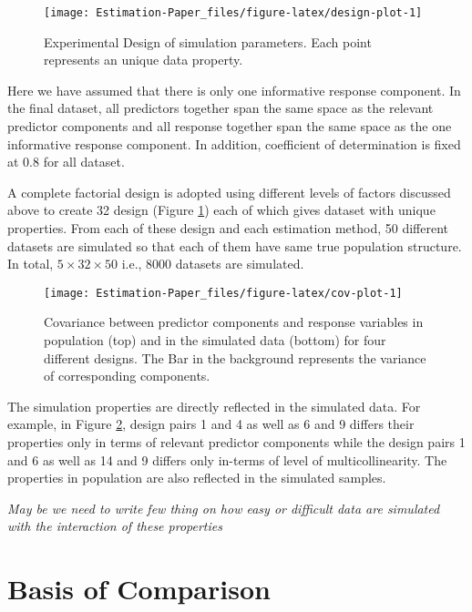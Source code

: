 \documentclass[12pt,3p,authoryear]{elsarticle}
\begin{document}
\begin{figure}
\texttt{[image: Estimation-Paper\_files/figure-latex/design-plot-1]} \caption{Experimental Design of simulation parameters. Each point represents an unique data property.}\label{fig:design-plot}
\end{figure}

Here we have assumed that there is only one informative response
component. In the final dataset, all predictors together span the same
space as the relevant predictor components and all response together
span the same space as the one informative response component. In
addition, coefficient of determination is fixed at 0.8 for all dataset.

A complete factorial design is adopted using different levels of factors
discussed above to create 32 design (Figure \ref{fig:design-plot}) each
of which gives dataset with unique properties. From each of these design
and each estimation method, 50 different datasets are simulated so that
each of them have same true population structure. In total,
\(5 \times 32 \times 50\) i.e., 8000 datasets are simulated.






\begin{figure}
\texttt{[image: Estimation-Paper\_files/figure-latex/cov-plot-1]} \caption{Covariance between predictor components and response
variables in population (top) and in the simulated data (bottom) for
four different designs. The Bar in the background represents the
variance of corresponding components.}\label{fig:cov-plot}
\end{figure}

The simulation properties are directly reflected in the simulated data.
For example, in Figure \ref{fig:cov-plot}, design pairs 1 and 4 as well
as 6 and 9 differs their properties only in terms of relevant predictor
components while the design pairs 1 and 6 as well as 14 and 9 differs
only in-terms of level of multicollinearity. The properties in
population are also reflected in the simulated samples.

\emph{\alert{May be we need to write few thing on how easy or difficult data are simulated with the interaction of these properties}}

\section{Basis of Comparison}\label{basis-of-comparison}
\end{document}
